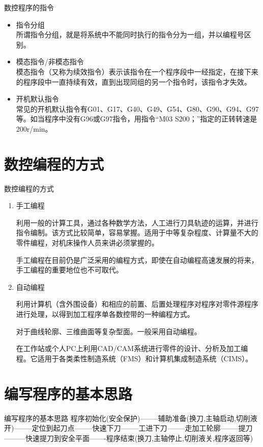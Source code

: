 \documentclass[UTF8,zihao=-4]{ctexbeamer}
\begin{document}
\begin{frame}{数控程序的指令}
	
	
	\begin{itemize}
		\item 指令分组\\所谓指令分组，就是将系统中不能同时执行的指令分为一组，并以编程号区别。
        
         \item 模态指令/非模态指令\\模态指令（又称为续效指令）表示该指令在一个程序段中一经指定，在接下来的程序段中一直持续有效，直到出现同组的另一个指令时，该指令才失效。
         
		\item 开机默认指令\\
        常见的开机默认指令有G01、G17、G40、G49、G54、G80、G90、G94、G97等。如当程序中没有G96或G97指令，用指令“M03 S200；”指定的正转转速是200r/min。 
	\end{itemize}
\end{frame}


\section{数控编程的方式}
\begin{frame}{数控编程的方式}
\begin{enumerate}
    \item 手工编程
    
    利用一般的计算工具，通过各种数学方法，人工进行刀具轨迹的运算，并进行指令编制。该方式比较简单，容易掌握。适用于中等复杂程度、计算量不大的零件编程，对机床操作人员来讲必须掌握的。
    
    手工编程在目前仍是广泛采用的编程方式，即使在自动编程高速发展的将来，手工编程的重要地位也不可取代。
    
    \item 自动编程  
    
    利用计算机（含外围设备）和相应的前置、后置处理程序对程序对零件源程序进行处理，以得到加工程序单各数控带的一种编程方式。
    
    对于曲线轮廓、三维曲面等复杂型面。一般采用自动编程。
    
    在工作站或个人PC上利用CAD/CAM系统进行零件的设计、分析及加工编程。它适用于各类柔性制造系统（FMS）和计算机集成制造系统（CIMS）。
    
\end{enumerate}
\end{frame}

\section{编写程序的基本思路}
\begin{frame}{编写程序的基本思路}
程序初始化(安全保护)--------辅助准备(换刀,主轴启动,切削液开)--------定位到起刀点--------快速下刀--------工进下刀--------走加工轮廓--------提刀---------快速提刀到安全平面-------程序结束(换刀,主轴停止,切削液关,程序返回等)
\end{frame}
\end{document}
